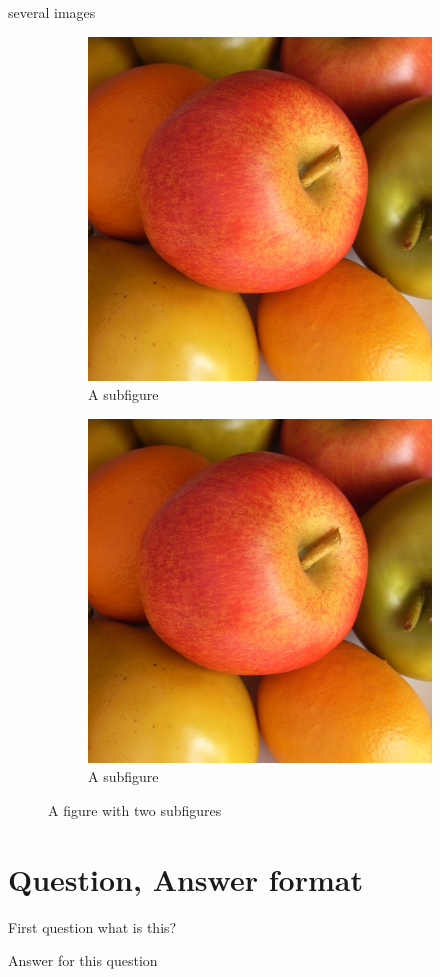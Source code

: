 several images

\begin{figure}[H]
\centering
\begin{subfigure}{.5\textwidth}
  \centering
  \includegraphics[width=.4\linewidth]{img/sample.jpg}
  \caption{A subfigure}
  \label{fig:sub1}
\end{subfigure}%
\begin{subfigure}{.5\textwidth}
  \centering
  \includegraphics[width=.4\linewidth]{img/sample.jpg}
  \caption{A subfigure}
  \label{fig:sub2}
\end{subfigure}
\caption{A figure with two subfigures}
\label{fig:test}
\end{figure}


\section{Question, Answer format}

\begin{qu}
First question what is this?
\end{qu}

Answer for this question



